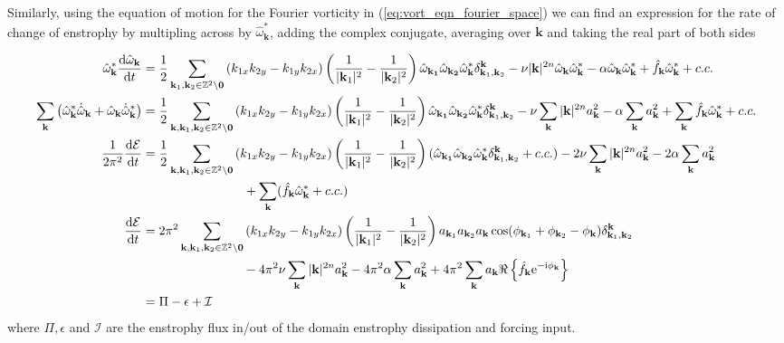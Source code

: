 \documentclass[9pt]{article}
\newcommand{\der}[2]{\frac{\mathrm{d}#1}{\mathrm{d}#2}}          	 %
\newcommand{\ii}{\mathrm{i}}      								  %
\newcommand{\e}{\mathrm{e}}      								  %
\newcommand{\omegahat}[1]{\hat{\omega}_{ \mathbf{#1} } }								%
\newcommand{\bfk}{\mathbf{k}}								%
\newcommand{\bfkn}[1]{\mathbf{k}_{#1}}								%
\begin{document}
Similarly, using the equation of motion for the Fourier vorticity in (\ref{eq:vort_eqn_fourier_space}) we can find an expression for the rate of change of enstrophy by multipling across by $\omegahat{k}^*$, adding the complex conjugate, averaging over $\bfk$ and taking the real part of both sides

\begin{align}
	\omegahat{k}^*\der{\omegahat{k}}{t} &= \frac{1}{2}	\sum_{\mathbf{k}_1, \mathbf{k}_2\in \mathbb{Z}^2\setminus \mathbf{0}}\left(k_{1x}k_{2y} - k_{1y}k_{2x}\right) \left(\frac{1}{|\bfkn{1}|^2} - \frac{1}{|\bfkn{2}|^2}\right) \omegahat{\bfkn{1}}\omegahat{\bfkn{2}}\omegahat{k}^* \delta_{\bfkn{1}, \bfkn{2}}^{\bfk} - \nu |\bfk|^{2n}\omegahat{k}\omegahat{k}^* - \alpha\omegahat{k}\omegahat{k}^* + \hat{f}_{\bfk} \omegahat{k}^* + c. c. \notag \\
	\sum_{\bfk}\left(\omegahat{k}^*\dot{\hat{\omega}}_\bfk + \omegahat{k}\dot{\hat{\omega}}^*_\bfk\right)&= \frac{1}{2}	\sum_{\bfk, \mathbf{k}_1, \mathbf{k}_2\in \mathbb{Z}^2\setminus \mathbf{0}}\left(k_{1x}k_{2y} - k_{1y}k_{2x}\right) \left(\frac{1}{|\bfkn{1}|^2} - \frac{1}{|\bfkn{2}|^2}\right) \omegahat{\bfkn{1}}\omegahat{\bfkn{2}}\omegahat{k}^* \delta_{\bfkn{1}, \bfkn{2}}^{\bfk} - \nu \sum_{\bfk}|\bfk|^{2n} a_{\bfk}^2 - \alpha\sum_{\bfk} a_{\bfk}^2 + \sum_{\bfk}\hat{f}_{\bfk} \omegahat{k}^* + c. c. \notag \\
	\frac{1}{2\pi^2}\der{\mathcal{E}}{t} &= \frac{1}{2}	\sum_{\bfk, \mathbf{k}_1, \mathbf{k}_2\in \mathbb{Z}^2\setminus \mathbf{0}}\left(k_{1x}k_{2y} - k_{1y}k_{2x}\right) \left(\frac{1}{|\bfkn{1}|^2} - \frac{1}{|\bfkn{2}|^2}\right) (\omegahat{\bfkn{1}}\omegahat{\bfkn{2}}\omegahat{k}^* \delta_{\bfkn{1}, \bfkn{2}}^{\bfk} + c.c.) - 2\nu \sum_{\bfk}|\bfk|^{2n} a_{\bfk}^2 - 2\alpha\sum_{\bfk} a_{\bfk}^2 \notag \\
	&\qquad \qquad \qquad \qquad+ \sum_{\bfk}(\hat{f}_{\bfk} \omegahat{k}^* + c. c.)\notag \\
	\der{\mathcal{E}}{t} &= 2\pi^2	\sum_{\bfk, \mathbf{k}_1, \mathbf{k}_2\in \mathbb{Z}^2\setminus \mathbf{0}}\left(k_{1x}k_{2y} - k_{1y}k_{2x}\right) \left(\frac{1}{|\bfkn{1}|^2} - \frac{1}{|\bfkn{2}|^2}\right) a_{\bfkn{1}} a_{\bfkn{2}} a_{\bfk} \cos(\phi_{\bfkn{1}} + \phi_{\bfkn{2}} - \phi_{\bfk}) \delta_{\bfkn{1}, \bfkn{2}}^{\bfk} \notag \\ & \qquad \qquad \qquad \qquad- 4\pi^2\nu \sum_{\bfk}|\bfk|^{2n} a_{\bfk}^2 - 4\pi^2\alpha\sum_{\bfk} a_{\bfk}^2 + 4\pi^2\sum_{\bfk}a_\bfk\Re\left\{\hat{f}_{\bfk} \e^{-\ii\phi_\bfk}\right\} \notag \\
	&= \Pi - \epsilon + \mathcal{I}
\end{align}
where $\Pi, \epsilon$ and $\mathcal{I}$ are the enstrophy flux in/out of the domain enstrophy dissipation and forcing input.
\end{document}
